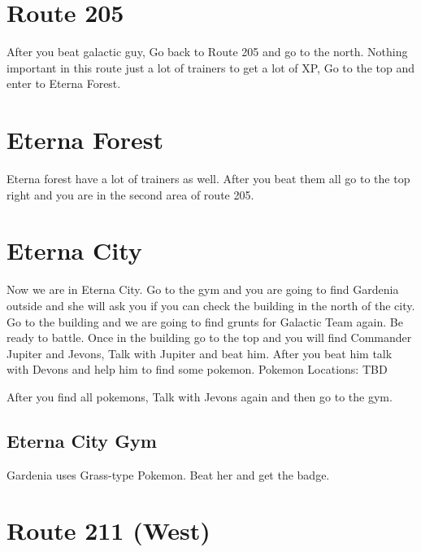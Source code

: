 \documentclass[11pt]{article}
\begin{document}
\section{Route 205}\label{sec:Route_205}
After you beat galactic guy, Go back to Route 205 and go to the north.
Nothing important in this route just a lot of trainers to get a lot of XP,
Go to the top and enter to Eterna Forest.




\section{Eterna Forest}\label{sec:Eterna_Forest}
Eterna forest have a lot of trainers as well.
After you beat them all go to the top right and you are in the second area of route 205.




\section{Eterna City}\label{sec:eterna-city}
Now we are in Eterna City.
Go to the gym and you are going to find Gardenia outside and she will ask you
if you can check the building in the north of the city.
Go to the building and we are going to find grunts for Galactic Team again.
Be ready to battle.
Once in the building go to the top and you will find
Commander Jupiter and Jevons, Talk with Jupiter and beat him.
After you beat him talk with Devons and help him to find some pokemon.
Pokemon Locations: TBD

After you find all pokemons, Talk with Jevons again and then go to the gym.

\subsection{Eterna City Gym}\label{subsec:eterna-city-gym}
Gardenia uses Grass-type Pokemon.
Beat her and get the badge.

\section{Route 211 (West)}\label{sec:Route_211_(West)}


\end{document}
